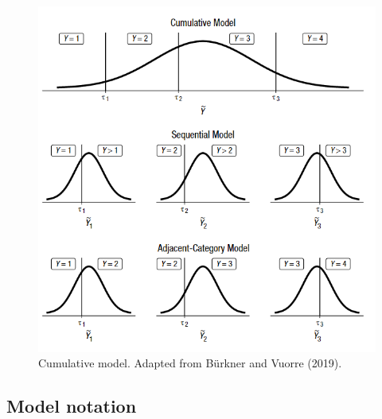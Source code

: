 \documentclass[
  man,floatsintext]{apa6}
\begin{document}
\begin{figure}

{\centering \includegraphics[width=1\linewidth]{img/fig-ordinal-models} 

}

\caption{Cumulative model. Adapted from Bürkner and Vuorre (2019).}\label{fig:fig-ordinal-models}
\end{figure}

\normalsize

\subsection{Model notation}\label{model-notation}
\end{document}
